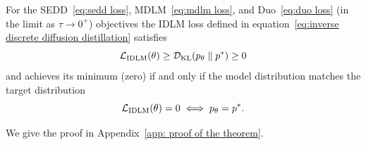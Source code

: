   \begin{theorem}
  \vspace{-1mm}
  \label{thm:unique solution} 
    For the SEDD~\eqref{eq:sedd loss}, MDLM~\eqref{eq:mdlm loss}, and Duo~\eqref{eq:duo loss} (in the limit as $\tau \to 0^{+}$) objectives the IDLM loss defined in equation~\eqref{eq:inverse discrete diffusion distillation} satisfies
    \begin{equation}
      \mathcal{L}_{\text{IDLM}}(\theta) \geq \mathcal{D}_{\text{KL}}(p_{\theta} \parallel p^*)\geq 0 \nonumber
    \end{equation}
    and achieves its minimum (zero) if and only if the model distribution matches the target distribution
    \vspace{-2mm}
    \begin{equation}
      \mathcal{L}_{\text{IDLM}}(\theta) = 0 \iff p_{\theta} = p^*. \nonumber
    \end{equation}
    \vspace{-2mm}
  \end{theorem}
  \vspace{-5mm}
  
  We give the proof in Appendix~\ref{app: proof of the theorem}.






